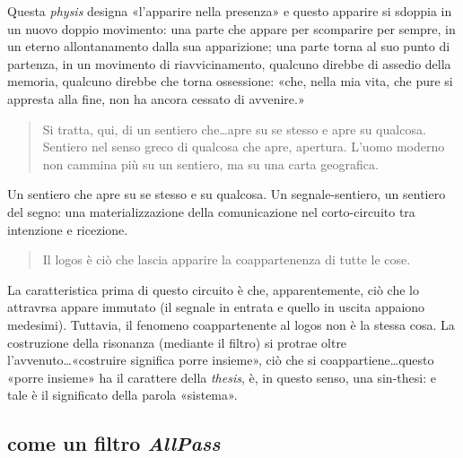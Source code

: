 \documentclass{../../lib/gs}
\begin{document}
Questa \emph{physis} designa «l'apparire nella presenza» e questo apparire si
sdoppia in un nuovo doppio movimento: una parte che appare per scomparire per
sempre, in un eterno allontanamento dalla sua apparizione; una parte torna al
suo punto di partenza, in un movimento di riavvicinamento, qualcuno direbbe di
assedio della memoria, qualcuno direbbe che torna ossessione: «che, nella mia
vita, che pure si appresta alla fine, non ha ancora cessato di avvenire.»

\begin{quote}
  \begin{sf}
    \small
    Si tratta, qui, di un sentiero che\ldots apre su se stesso e apre su
    qualcosa. Sentiero nel senso greco di qualcosa che apre, apertura. L'uomo
    moderno non cammina più su un sentiero, ma su una carta geografica.
  \end{sf}
\end{quote}

Un sentiero che apre su se stesso e su qualcosa. Un segnale-sentiero, un sentiero
del segno: una materializzazione della comunicazione nel corto-circuito tra
intenzione e ricezione.

\begin{quote}
  \begin{sf}
    \small
    Il logos è ciò che lascia apparire la coappartenenza di tutte le cose.
  \end{sf}
\end{quote}

La caratteristica prima di questo circuito è che, apparentemente, ciò che lo
attravrsa appare immutato (il segnale in entrata e quello in uscita appaiono
medesimi). Tuttavia, il fenomeno coappartenente al logos non è la stessa cosa.
La costruzione della risonanza (mediante il filtro) si protrae oltre
l'avvenuto\ldots «costruire significa porre insieme», ciò che si
coappartiene\ldots questo «porre insieme» ha il carattere della \emph{thesis},
è, in questo senso, una sin-thesi: e tale è il significato della parola «sistema».


\subsection{come un filtro \emph{AllPass}}
\end{document}
